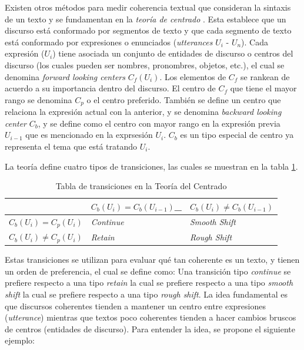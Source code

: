 \documentclass[12pt]{diicc}
\begin{document}
Existen otros métodos para medir coherencia textual que consideran la sintaxis de un texto  \cite{t33} \cite{t34} \cite{t35} y se fundamentan en la {\em teoría de centrado} \cite{t36}. Esta establece que un discurso está conformado por segmentos de texto y que cada segmento de texto está conformado por expresiones o enunciados ({\em utterances} $U_i$ - $U_n$). Cada expresión ($U_i$) tiene asociada un conjunto de entidades de discurso o centros del discurso (los cuales pueden ser nombres, pronombres, objetos, etc.), el cual se denomina {\em forward looking centers} $C_f(U_i)$. Los elementos de $C_f$ se rankean de acuerdo a su importancia dentro del discurso. El centro de $C_f$ que tiene el mayor rango se denomina $C_p$ o el centro preferido. También se define un centro que relaciona la expresión actual con la anterior, y se denomina {\em backward looking center} $C_b$, y se define como el centro con mayor rango en la expresión previa $U_{i-1}$ que es mencionado en la exprsesión $U_i$. $C_b$ es un tipo especial de centro ya representa el tema que está tratando $U_i$.

La teoría define cuatro tipos de transiciones, las cuales se muestran en la tabla \ref{t1}.

\begin{table}[!htbp]
\centering
\caption{Tabla de transiciones en la Teoría del Centrado}
\label{t1}
\begin{tabular}{lll}
\hline
\hline
                        & $C_b(U_i)=C_b(U_{i-1})$\_ & $C_b(U_i)\neq C_b(U_{i-1})$ \\
\hline
$C_b(U_i)=C_p(U_i)$     & {\em Continue}          & {\em Smooth Shift}        \\
$C_b(U_i)\neq C_p(U_i)$ & {\em Retain}            & {\em Rough Shift}         \\
\hline
\hline   
\end{tabular}
\end{table}

Estas transiciones se utilizan para evaluar qué tan coherente es un texto, y tienen un orden de preferencia, el cual se define como: Una transición tipo {\em continue} se prefiere respecto a una tipo {\em retain} la cual se prefiere respecto a una tipo {\em smooth shift} la cual se prefiere respecto a una tipo {\em rough shift}. La idea fundamental es que discursos coherentes tienden a mantener un centro entre expresiones ({\em utterance}) mientras que textos poco coherentes tienden a hacer cambios bruscos de centros (entidades de discurso). Para entender la idea, se propone el siguiente ejemplo:
\end{document}
